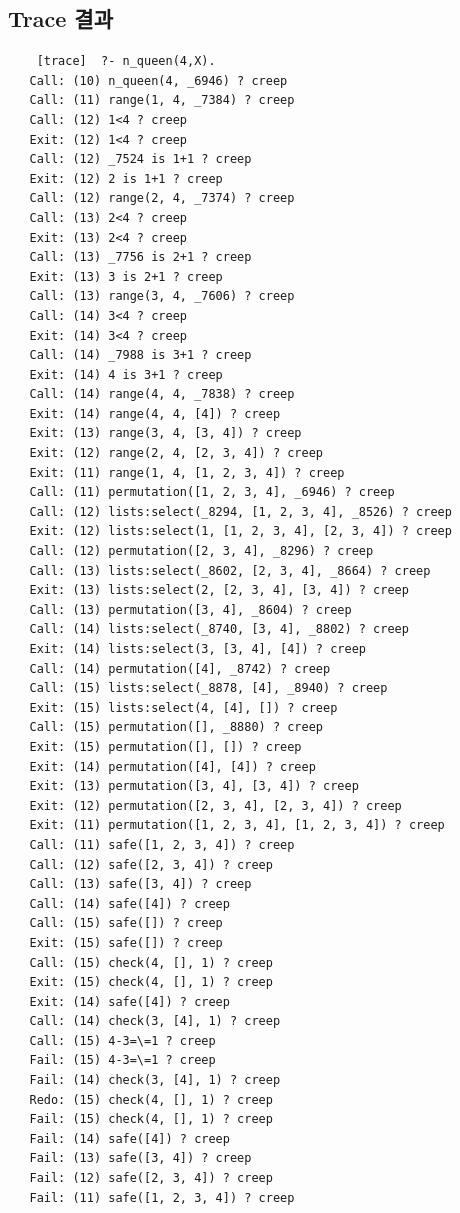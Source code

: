 \documentclass{article}
\begin{document}
\subsection{Trace 결과}
\begin{verbatim}
    [trace]  ?- n_queen(4,X).
   Call: (10) n_queen(4, _6946) ? creep
   Call: (11) range(1, 4, _7384) ? creep
   Call: (12) 1<4 ? creep
   Exit: (12) 1<4 ? creep
   Call: (12) _7524 is 1+1 ? creep
   Exit: (12) 2 is 1+1 ? creep
   Call: (12) range(2, 4, _7374) ? creep
   Call: (13) 2<4 ? creep
   Exit: (13) 2<4 ? creep
   Call: (13) _7756 is 2+1 ? creep
   Exit: (13) 3 is 2+1 ? creep
   Call: (13) range(3, 4, _7606) ? creep
   Call: (14) 3<4 ? creep
   Exit: (14) 3<4 ? creep
   Call: (14) _7988 is 3+1 ? creep
   Exit: (14) 4 is 3+1 ? creep
   Call: (14) range(4, 4, _7838) ? creep
   Exit: (14) range(4, 4, [4]) ? creep
   Exit: (13) range(3, 4, [3, 4]) ? creep
   Exit: (12) range(2, 4, [2, 3, 4]) ? creep
   Exit: (11) range(1, 4, [1, 2, 3, 4]) ? creep
   Call: (11) permutation([1, 2, 3, 4], _6946) ? creep
   Call: (12) lists:select(_8294, [1, 2, 3, 4], _8526) ? creep
   Exit: (12) lists:select(1, [1, 2, 3, 4], [2, 3, 4]) ? creep
   Call: (12) permutation([2, 3, 4], _8296) ? creep
   Call: (13) lists:select(_8602, [2, 3, 4], _8664) ? creep
   Exit: (13) lists:select(2, [2, 3, 4], [3, 4]) ? creep
   Call: (13) permutation([3, 4], _8604) ? creep
   Call: (14) lists:select(_8740, [3, 4], _8802) ? creep
   Exit: (14) lists:select(3, [3, 4], [4]) ? creep
   Call: (14) permutation([4], _8742) ? creep
   Call: (15) lists:select(_8878, [4], _8940) ? creep
   Exit: (15) lists:select(4, [4], []) ? creep
   Call: (15) permutation([], _8880) ? creep
   Exit: (15) permutation([], []) ? creep
   Exit: (14) permutation([4], [4]) ? creep
   Exit: (13) permutation([3, 4], [3, 4]) ? creep
   Exit: (12) permutation([2, 3, 4], [2, 3, 4]) ? creep
   Exit: (11) permutation([1, 2, 3, 4], [1, 2, 3, 4]) ? creep
   Call: (11) safe([1, 2, 3, 4]) ? creep
   Call: (12) safe([2, 3, 4]) ? creep
   Call: (13) safe([3, 4]) ? creep
   Call: (14) safe([4]) ? creep
   Call: (15) safe([]) ? creep
   Exit: (15) safe([]) ? creep
   Call: (15) check(4, [], 1) ? creep
   Exit: (15) check(4, [], 1) ? creep
   Exit: (14) safe([4]) ? creep
   Call: (14) check(3, [4], 1) ? creep
   Call: (15) 4-3=\=1 ? creep
   Fail: (15) 4-3=\=1 ? creep
   Fail: (14) check(3, [4], 1) ? creep
   Redo: (15) check(4, [], 1) ? creep
   Fail: (15) check(4, [], 1) ? creep
   Fail: (14) safe([4]) ? creep
   Fail: (13) safe([3, 4]) ? creep
   Fail: (12) safe([2, 3, 4]) ? creep
   Fail: (11) safe([1, 2, 3, 4]) ? creep

\end{verbatim}
\end{document}
